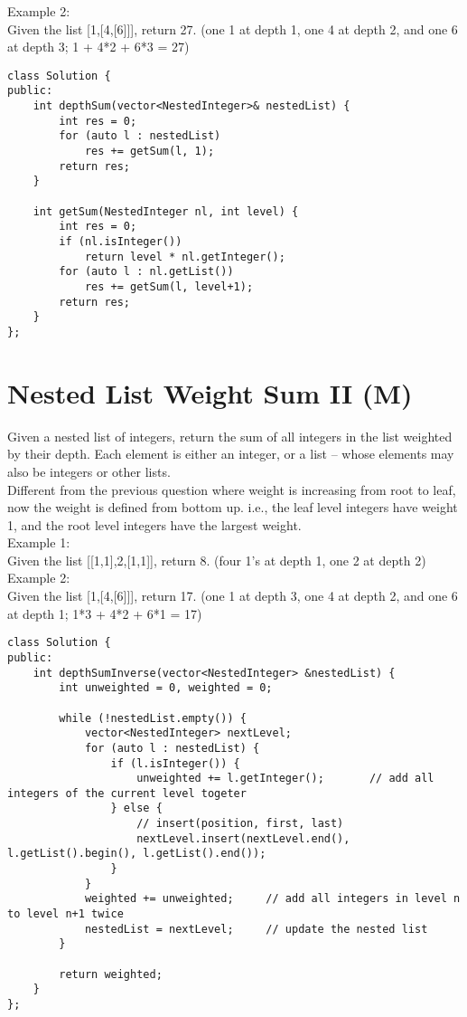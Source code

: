 Example 2:\\
Given the list [1,[4,[6]]], return 27. (one 1 at depth 1, one 4 at depth 2, and one 6 at depth 3; 1 + 4*2 + 6*3 = 27) \\
 
\begin{lstlisting}
class Solution {
public:
    int depthSum(vector<NestedInteger>& nestedList) {
        int res = 0;
        for (auto l : nestedList)
            res += getSum(l, 1);
        return res;
    }
        
    int getSum(NestedInteger nl, int level) {
        int res = 0;
        if (nl.isInteger())
            return level * nl.getInteger();
        for (auto l : nl.getList())
            res += getSum(l, level+1);
        return res;
    }
};
\end{lstlisting}


\section{Nested List Weight Sum II (M)}
Given a nested list of integers, return the sum of all integers in the list weighted by their depth. Each element is either an integer, or a list -- whose elements may also be integers or other lists.\\

Different from the previous question where weight is increasing from root to leaf, now the weight is defined from bottom up. i.e., the leaf level integers have weight 1, and the root level integers have the largest weight. \\

Example 1:\\
Given the list [[1,1],2,[1,1]], return 8. (four 1's at depth 1, one 2 at depth 2)\\

Example 2:\\
Given the list [1,[4,[6]]], return 17. (one 1 at depth 3, one 4 at depth 2, and one 6 at depth 1; 1*3 + 4*2 + 6*1 = 17)  \\

\begin{lstlisting}
class Solution {
public:
    int depthSumInverse(vector<NestedInteger> &nestedList) {
        int unweighted = 0, weighted = 0;
        
        while (!nestedList.empty()) {
            vector<NestedInteger> nextLevel;
            for (auto l : nestedList) {
                if (l.isInteger()) {
                    unweighted += l.getInteger();       // add all integers of the current level togeter
                } else {
                    // insert(position, first, last)
                    nextLevel.insert(nextLevel.end(), l.getList().begin(), l.getList().end());
                }
            }
            weighted += unweighted;     // add all integers in level n to level n+1 twice
            nestedList = nextLevel;     // update the nested list
        }
        
        return weighted;
    }
};
\end{lstlisting}


